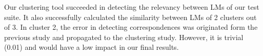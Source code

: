Our clustering tool succeeded in detecting the relevancy between LMs of our test suite. It also successfully calculated the similarity between LMs of 2 clusters out of 3. In cluster 2, the error in detecting correspondences was originated form the previous study and propagated to the clustering study. However, it is trivial (0.01) and would have a low impact in our final results.
